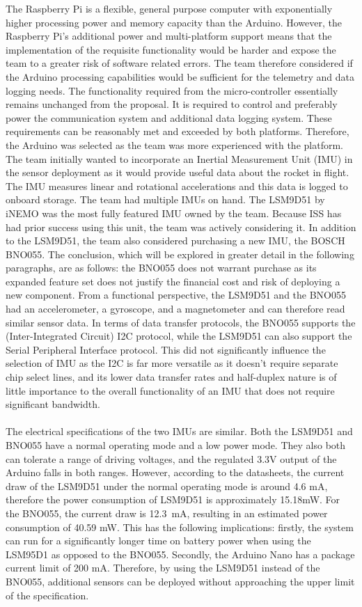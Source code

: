 The Raspberry Pi is a flexible, general purpose computer with exponentially higher processing power and memory capacity than the Arduino. However, the Raspberry Pi’s additional power and multi-platform support means that the implementation of the requisite functionality would be harder and expose the team to a greater risk of software related errors. The team therefore considered if the Arduino processing capabilities would be sufficient for the telemetry and data logging needs. 
	The functionality required from the micro-controller essentially remains unchanged from the proposal. It is required to control and preferably power the communication system and additional data logging system. These requirements can be reasonably met and exceeded by both platforms. Therefore, the Arduino was selected as the team was more experienced with the platform. 
The team initially wanted to incorporate an Inertial Measurement Unit (IMU) in the sensor deployment as it would provide useful data about the rocket in flight. The IMU measures linear and rotational accelerations and this data is logged to onboard storage. The team had multiple IMUs on hand. The LSM9D51 by iNEMO was the most fully featured IMU owned by the team. Because ISS has had prior success using this unit, the team was actively considering it. In addition to the LSM9D51, the team also considered purchasing a new IMU, the BOSCH BNO055. The conclusion, which will be explored in greater detail in the following paragraphs, are as follows: the BNO055 does not warrant purchase as its expanded feature set does not justify the financial cost and risk of deploying a new component.  
From a functional perspective, the LSM9D51 and the BNO055 had an accelerometer, a gyroscope, and a magnetometer and can therefore read similar sensor data. In terms of data transfer protocols, the BNO055 supports the (Inter-Integrated Circuit) I2C protocol, while the LSM9D51 can also support the Serial Peripheral Interface protocol. This did not significantly influence the selection of IMU as the I2C is far more versatile as it doesn’t require separate chip select lines, and its lower data transfer rates and half-duplex nature is of little importance to the overall functionality of an IMU that does not require significant bandwidth.\\\\
The electrical specifications of the two IMUs are similar. Both the LSM9D51 and BNO055 have a normal operating mode and a low power mode. They also both can tolerate a range of driving voltages, and the regulated 3.3V output of the Arduino falls in both ranges. However, according to the datasheets, the current draw of the LSM9D51 under the normal operating mode is around 4.6 mA, therefore the power consumption of LSM9D51 is approximately 15.18mW. For the BNO055, the current draw is \SI{12.3}{\milli\ampere}, resulting in an estimated power consumption of 40.59 mW. This has the following implications: firstly, the system can run for a significantly longer time on battery power when using the LSM95D1 as opposed to the BNO055. Secondly, the Arduino Nano has a package current limit of 200 mA. Therefore, by using the LSM9D51 instead of the BNO055, additional sensors can be deployed without approaching the upper limit of the specification. 	
